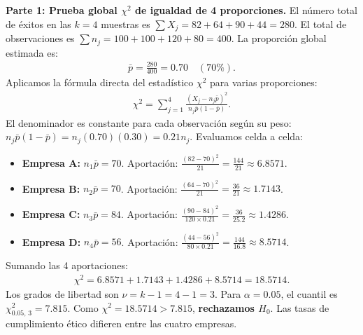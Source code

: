 \begin{solproblema}
	\textbf{Parte 1: Prueba global $\chi^2$ de igualdad de 4 proporciones.}
	El número total de éxitos en las $k=4$ muestras es $\sum X_j = 82 + 64 + 90 + 44 = 280$. El total de observaciones es $\sum n_j = 100 + 100 + 120 + 80 = 400$. La proporción global estimada es:
	\begin{align}
		\bar{p} = \frac{280}{400} = 0.70 \quad (70\%).
	\end{align}
	Aplicamos la fórmula directa del estadístico $\chi^2$ para varias proporciones:
	\begin{align}
		\chi^2 = \sum_{j=1}^4 \frac{(X_j - n_j \bar{p})^2}{n_j \bar{p}(1-\bar{p})}.
	\end{align}
	El denominador es constante para cada observación según su peso: $n_j \bar{p}(1-\bar{p}) = n_j(0.70)(0.30) = 0.21 n_j$. Evaluamos celda a celda:
	\begin{itemize}
		\item \textbf{Empresa A:} $n_1 \bar{p} = 70$. Aportación: $\frac{(82 - 70)^2}{21} = \frac{144}{21} \approx 6.8571$.
		\item \textbf{Empresa B:} $n_2 \bar{p} = 70$. Aportación: $\frac{(64 - 70)^2}{21} = \frac{36}{21} \approx 1.7143$.
		\item \textbf{Empresa C:} $n_3 \bar{p} = 84$. Aportación: $\frac{(90 - 84)^2}{120 \times 0.21} = \frac{36}{25.2} \approx 1.4286$.
		\item \textbf{Empresa D:} $n_4 \bar{p} = 56$. Aportación: $\frac{(44 - 56)^2}{80 \times 0.21} = \frac{144}{16.8} \approx 8.5714$.
	\end{itemize}
	Sumando las 4 aportaciones:
	\begin{align}
		\chi^2 = 6.8571 + 1.7143 + 1.4286 + 8.5714 = 18.5714.
	\end{align}
	Los grados de libertad son $\nu = k - 1 = 4 - 1 = 3$. Para $\alpha = 0.05$, el cuantil es $\chi^2_{0.05, \, 3} = 7.815$.
	Como $\chi^2 = 18.5714 > 7.815$, \textbf{rechazamos $H_0$}. Las tasas de cumplimiento ético difieren entre las cuatro empresas.
	

\end{solproblema}

